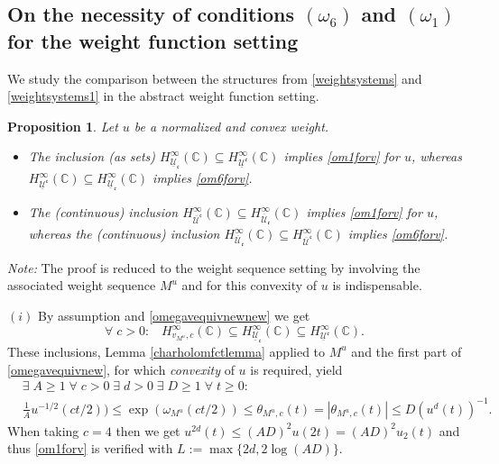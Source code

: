 \documentclass[10pt]{amsart}%
\numberwithin{equation}{section}
\theoremstyle{plain}
\newtheorem{proposition}{Proposition}[section]
\newcommand{\CC}{\mathbb{C}}
\begin{document}
\subsection{On the necessity of conditions $(\omega_6)$ and $(\omega_1)$ for the weight function setting}\label{necsectionweightfct}

We study the comparison between the structures from \eqref{weightsystems} and \eqref{weightsystems1} in the abstract weight function setting.

\begin{proposition}\label{secondweighfctpropconv1}
Let $u$ be a normalized and convex weight.
\begin{itemize}
\item[$(i)$] The inclusion (as sets) $H^{\infty}_{\underline{\mathcal{U}}_{\mathfrak{c}}}(\CC)\subseteq H^{\infty}_{\underline{\mathcal{U}}^{\mathfrak{c}}}(\CC)$ implies \eqref{om1forv} for $u$, whereas $H^{\infty}_{\underline{\mathcal{U}}^{\mathfrak{c}}}(\CC)\subseteq H^{\infty}_{\underline{\mathcal{U}}_{\mathfrak{c}}}(\CC)$ implies \eqref{om6forv}.

\item[$(ii)$] The (continuous) inclusion $H^{\infty}_{\overline{\mathcal{U}}^{\mathfrak{c}}}(\CC)\subseteq H^{\infty}_{\overline{\mathcal{U}}_{\mathfrak{c}}}(\CC)$ implies \eqref{om1forv} for $u$, whereas the (continuous) inclusion $H^{\infty}_{\overline{\mathcal{U}}_{\mathfrak{c}}}(\CC)\subseteq H^{\infty}_{\overline{\mathcal{U}}^{\mathfrak{c}}}(\CC)$ implies \eqref{om6forv}.
\end{itemize}
\end{proposition}

{\itshape Note:} The proof is reduced to the weight sequence setting by involving the associated weight sequence $M^u$ and for this convexity of $u$ is indispensable.

$(i)$ By assumption and \eqref{omegavequivnewnew} we get
$$\forall\;c>0:\;\;\;H^{\infty}_{v_{M^u},c}(\CC)\subseteq H^{\infty}_{\underline{\mathcal{U}}_{\mathfrak{c}}}(\CC)\subseteq H^{\infty}_{\underline{\mathcal{U}}^{\mathfrak{c}}}(\CC).$$
These inclusions, Lemma \ref{charholomfctlemma} applied to $M^u$ and the first part of \eqref{omegavequivnew}, for which \emph{convexity} of $u$ is required, yield
\begin{align*}
&\exists\;A\ge 1\;\forall\;c>0\;\exists\;d>0\;\exists\;D\ge 1\;\forall\;t\ge 0:
\\&
\frac{1}{A}u^{-1/2}(ct/2))\le\exp(\omega_{M^u}(ct/2))\le\theta_{M^u,c}(t)=|\theta_{M^u,c}(t)|\le D(u^d(t))^{-1}.
\end{align*}
When taking $c=4$ then we get $u^{2d}(t)\le(AD)^2u(2t)=(AD)^2u_2(t)$ and thus \eqref{om1forv} is verified with $L:=\max\{2d,2\log(AD)\}$.
\end{document}
